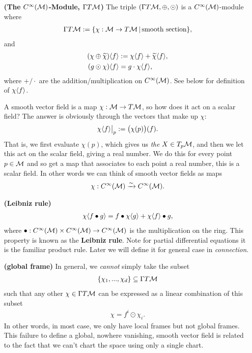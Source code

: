 \documentclass[12pt]{article} %
\newcommand{\bfs}[1]{\textbf{({#1}) }}
\begin{document}
\bd\bfs{The $C^{\infty}(\mathcal{M})$-Module, $\Gamma T\mathcal{M}$}
    The triple $(\Gamma T\mathcal{M},\oplus,\odot)$ is a $C^{\infty}(\mathcal{M})$-module where 
    \begin{align*}
        \Gamma T\mathcal{M} := \{ \chi :\mathcal{M} \to T\mathcal{M} \, | \, \text{smooth section}\},
    \end{align*}
    and 
    \begin{align*}
        \begin{split}
            (\chi\oplus \widetilde{\chi})\langle f\rangle & := \chi\langle f\rangle + \widetilde{\chi}\langle f\rangle, \\
            (g\odot \chi)\langle f\rangle & = g \cdot \chi\langle f \rangle, 
        \end{split}
    \end{align*}
    where $+/\cdot$ are the addition/multiplication on $C^{\infty}(\mathcal{M})$. See below for definition of $\chi\langle f\rangle$.
\ed 
\begin{rema}
A smooth vector field is a map $\chi:\mathcal{M}\to T\mathcal{M}$, so how does it act on a scalar field? The answer is obviously through the vectors that make up $\chi$: 
\begin{align*}
    \chi\langle f\rangle\big|_{p} := \big(\chi(p)\big)(f).
\end{align*}
That is, we first evaluate $\chi(p)$, which gives us \textit{the} $X\in T_p\mathcal{M}$, and then we let this act on the scalar field, giving a real number. We do this for every point $p\in\mathcal{M}$ and so get a map that associates to each point a real number, this is a scalar field. In other words we can think of smooth vector fields as maps 
\begin{align*}
    \chi : C^{\infty}(\mathcal{M}) \xrightarrow{\sim} C^{\infty}(\mathcal{M}).
\end{align*}
\end{rema}
\begin{rema}\bfs{Leibniz rule}
 \begin{align*}
        \chi \langle f\bullet g\rangle = f\bullet \chi\langle g \rangle + \chi\langle f\rangle \bullet g,
    \end{align*}
    where $\bullet : C^{\infty}(\mathcal{M})\times C^{\infty}(\mathcal{M}) \to C^{\infty}(\mathcal{M})$ is the multiplication on the ring. This property is known as the \textbf{Leibniz rule}. Note for partial differential equations it is the familiar product rule. Later we will define it for general case in \textit{connection}.
\end{rema}

\begin{rema}\bfs{global frame}
 In general, we \textit{cannot} simply take the subset 
\begin{align*}
    \{\chi_1,...,\chi_d\} \subseteq \Gamma T\mathcal{M}
\end{align*}
such that any other $\chi\in\Gamma T\mathcal{M}$ can be expressed as a linear combination of this subset
\begin{align*}
    \chi = f^i \odot \chi_i.
\end{align*}
In other words, in most case, we only have local frames but not global frames. 
This failure to define a global, nowhere vanishing, smooth vector field is related to the fact that we can't chart the space using only a single chart. 
\end{rema}
\end{document}
